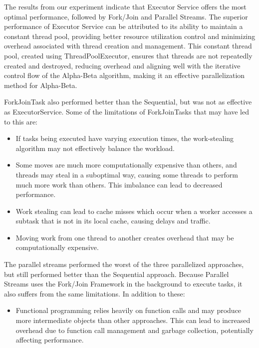 \documentclass[conference, 11pt]{IEEEtran}
\begin{document}
The results from our experiment indicate that Executor Service offers the most optimal performance, followed by Fork/Join and Parallel Streams. The superior performance of Executor Service can be attributed to its ability to maintain a constant thread pool, providing better resource utilization control and minimizing overhead associated with thread creation and management. This constant thread pool, created using ThreadPoolExecutor, ensures that threads are not repeatedly created and destroyed, reducing overhead and aligning well with the iterative control flow of the Alpha-Beta algorithm, making it an effective parallelization method for Alpha-Beta.

ForkJoinTask also performed better than the Sequential, but was not as effective as ExecutorService. Some of the limitations of ForkJoinTasks that may have led to this are:

\begin{itemize}
\item If tasks being executed have varying execution times, the work-stealing algorithm may not effectively balance the workload.
\item Some moves are much more computationally expensive than others, and threads may steal in a suboptimal way, causing some threads to perform much more work than others. This imbalance can lead to decreased performance.
\item Work stealing can lead to cache misses which occur when a worker accesses a subtask that is not in its local cache, causing delays and traffic.
\item Moving work from one thread to another creates overhead that may be computationally expensive.
\end{itemize}

The parallel streams performed the worst of the three parallelized approaches, but still performed better than the Sequential approach. Because Parallel Streams uses the Fork/Join Framework in the background to execute tasks, it also suffers from the same limitations. In addition to these:

\begin{itemize}
\item Functional programming relies heavily on function calls and may produce more intermediate objects than other approaches. This can lead to increased overhead due to function call management and garbage collection, potentially affecting performance.
\end{itemize} \\
\end{document}
